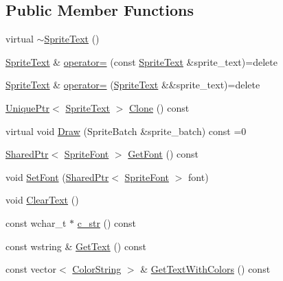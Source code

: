 \subsection*{Public Member Functions}
\begin{DoxyCompactItemize}
\item 
virtual \hyperlink{classmage_1_1_sprite_text_aa30d68a79775dce902c190f2cd298bb4}{$\sim$\+Sprite\+Text} ()
\item 
\hyperlink{classmage_1_1_sprite_text}{Sprite\+Text} \& \hyperlink{classmage_1_1_sprite_text_af027a281c1fa600dd870ca04d91fcae8}{operator=} (const \hyperlink{classmage_1_1_sprite_text}{Sprite\+Text} \&sprite\+\_\+text)=delete
\item 
\hyperlink{classmage_1_1_sprite_text}{Sprite\+Text} \& \hyperlink{classmage_1_1_sprite_text_a7e2e165d7682d9cc623b7c9725f76920}{operator=} (\hyperlink{classmage_1_1_sprite_text}{Sprite\+Text} \&\&sprite\+\_\+text)=delete
\item 
\hyperlink{namespacemage_a8c307fbcc33bce9b7f2aa4c26c3b95cf}{Unique\+Ptr}$<$ \hyperlink{classmage_1_1_sprite_text}{Sprite\+Text} $>$ \hyperlink{classmage_1_1_sprite_text_ad76e6d91e59f5070152104da8af1aa4e}{Clone} () const
\item 
virtual void \hyperlink{classmage_1_1_sprite_text_a45d5ac8410d5a46b26e8491946a2ad9e}{Draw} (Sprite\+Batch \&sprite\+\_\+batch) const =0
\item 
\hyperlink{namespacemage_a1e01ae66713838a7a67d30e44c67703e}{Shared\+Ptr}$<$ \hyperlink{classmage_1_1_sprite_font}{Sprite\+Font} $>$ \hyperlink{classmage_1_1_sprite_text_a1c80933525f87fe4dced9479c1b79764}{Get\+Font} () const
\item 
void \hyperlink{classmage_1_1_sprite_text_a8e753dcd210b1fdf9c5399a9f0f3415d}{Set\+Font} (\hyperlink{namespacemage_a1e01ae66713838a7a67d30e44c67703e}{Shared\+Ptr}$<$ \hyperlink{classmage_1_1_sprite_font}{Sprite\+Font} $>$ font)
\item 
void \hyperlink{classmage_1_1_sprite_text_a73c5a10e846e94f2f79a25a78bf2e6d0}{Clear\+Text} ()
\item 
const wchar\+\_\+t $\ast$ \hyperlink{classmage_1_1_sprite_text_ada15a0d1986cf1f2c2ac7302be20d6a7}{c\+\_\+str} () const
\item 
const wstring \& \hyperlink{classmage_1_1_sprite_text_a48587554bd7f6536aa95cf8dd681ebfb}{Get\+Text} () const
\item 
const vector$<$ \hyperlink{structmage_1_1_color_string}{Color\+String} $>$ \& \hyperlink{classmage_1_1_sprite_text_a0e7be9334dcb7366c5400f2b34615b5c}{Get\+Text\+With\+Colors} () const

\end{DoxyCompactItemize}

